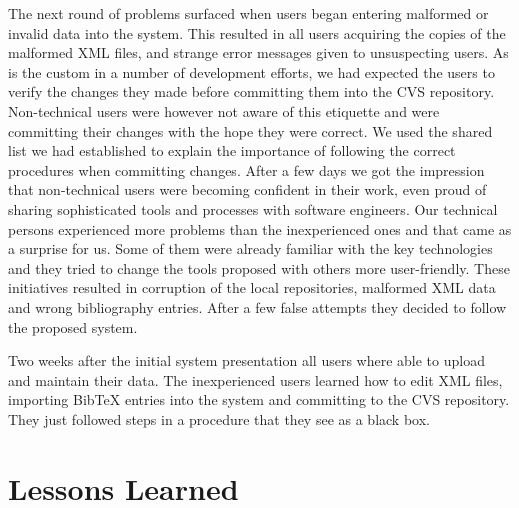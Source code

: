 \documentclass[10pt]{article}
\begin{document}
The next round of problems surfaced when users began entering
malformed or invalid data into the system.
This resulted in all users acquiring the copies of the malformed
{\sc XML} files, and strange error messages given to unsuspecting
users.
As is the custom in a number of development efforts, we had
expected the users to verify the changes they made before
committing them into the {\sc CVS} repository.
Non-technical users were however not aware of this etiquette
and were committing their changes with the hope they were correct.
We used the shared list we had established to explain the
importance of following the correct procedures when committing changes.
After a few days we got the impression that non-technical users
were becoming confident in their work, even proud of sharing
sophisticated tools and processes with software engineers.
Our technical persons experienced more problems than the inexperienced ones 
and that came as a surprise for us. Some of them were already familiar 
with the key technologies and they tried to change the tools proposed with others 
more user-friendly. 
These initiatives resulted in corruption of the local repositories, malformed 
{\sc XML} data and wrong bibliography entries.
After a few false attempts they decided to follow the proposed system.

Two weeks after the initial system presentation all users where able to upload 
and maintain their data. The inexperienced users learned how to edit {\sc XML} files,
importing {\sc BibTeX} entries into the system and committing to the {\sc CVS} repository. 
They just followed steps in a procedure that they see as a black box. 

\section{Lessons Learned}
\label{sec:concl}
\end{document}
